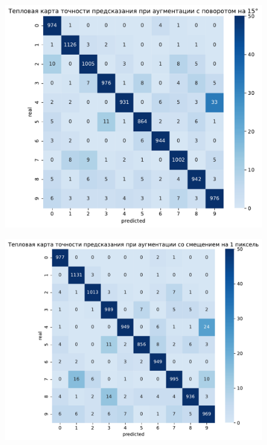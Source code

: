 \documentclass{article}
\begin{document}
\begin{figure}[H]
{\begin{minipage}{8cm}
		\end{minipage}
		\label{app:rot10}
	}
	\subfigure
	{
		\begin{minipage}{8cm}
			\centering
			\includegraphics[scale=0.35]{TASK1 warm map rotated15.pdf}
		\end{minipage}
		\label{app:rot15}
	}
	\subfigure
	{
	    \begin{minipage}{8cm}
            \centering
            \includegraphics[scale=0.35]{TASK1 warm map shift1piks.pdf}
        \end{minipage}
}
\end{figure}
\end{document}
